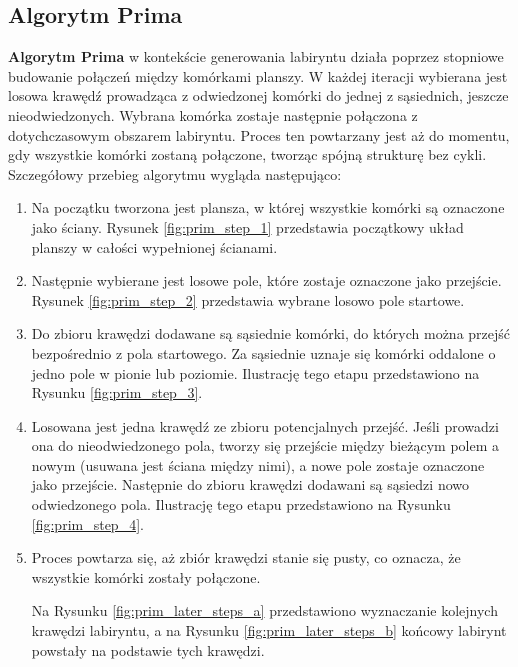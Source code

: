 \subsection{Algorytm Prima}

\textbf{Algorytm Prima} \cite{cormen2009} w kontekście generowania labiryntu działa poprzez stopniowe budowanie połączeń między komórkami planszy. W każdej iteracji wybierana jest losowa krawędź prowadząca z odwiedzonej komórki do jednej z sąsiednich, jeszcze nieodwiedzonych. Wybrana komórka zostaje następnie połączona z dotychczasowym obszarem labiryntu. Proces ten powtarzany jest aż do momentu, gdy wszystkie komórki zostaną połączone, tworząc spójną strukturę bez cykli. Szczegółowy przebieg algorytmu wygląda następująco:

\begin{enumerate}
    \item Na początku tworzona jest plansza, w której wszystkie komórki są oznaczone jako ściany. Rysunek \ref{fig:prim_step_1} przedstawia początkowy układ planszy w całości wypełnionej ścianami.
    
    

    \item Następnie wybierane jest losowe pole, które zostaje oznaczone jako przejście. Rysunek \ref{fig:prim_step_2} przedstawia wybrane losowo pole startowe.
    
    

    \item Do zbioru krawędzi dodawane są sąsiednie komórki, do których można przejść bezpośrednio z pola startowego. Za sąsiednie uznaje się komórki oddalone o jedno pole w pionie lub poziomie. Ilustrację tego etapu przedstawiono na Rysunku \ref{fig:prim_step_3}.
    
    

    \item Losowana jest jedna krawędź ze zbioru potencjalnych przejść. Jeśli prowadzi ona do nieodwiedzonego pola, tworzy się przejście między bieżącym polem a nowym (usuwana jest ściana między nimi), a nowe pole zostaje oznaczone jako przejście. Następnie do zbioru krawędzi dodawani są sąsiedzi nowo odwiedzonego pola. Ilustrację tego etapu przedstawiono na Rysunku \ref{fig:prim_step_4}.

    

    \item Proces powtarza się, aż zbiór krawędzi stanie się pusty, co oznacza, że wszystkie komórki zostały połączone.

    Na Rysunku \ref{fig:prim_later_steps_a} przedstawiono wyznaczanie kolejnych krawędzi labiryntu, a na Rysunku \ref{fig:prim_later_steps_b} końcowy labirynt powstały na podstawie tych krawędzi.
    
    
\end{enumerate}